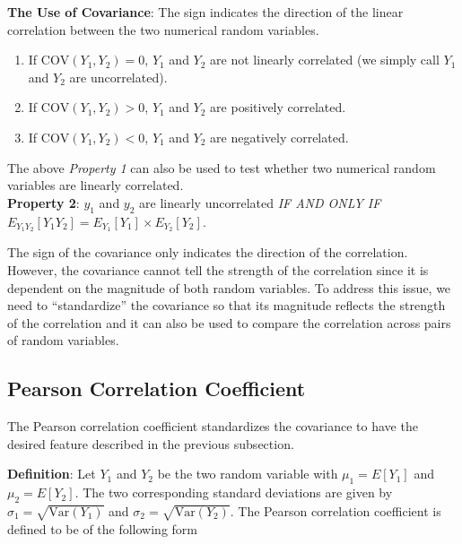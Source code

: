 \documentclass[
]{book}
\begin{document}
\textbf{The Use of Covariance}: The sign indicates the direction of the linear correlation between the two numerical random variables.

\begin{enumerate}
\def\labelenumi{\arabic{enumi}.}
\item
  If \(\text{COV}(Y_1, Y_2) = 0\), \(Y_1\) and \(Y_2\) are not linearly correlated (we simply call \(Y_1\) and \(Y_2\) are uncorrelated).
\item
  If \(\text{COV}(Y_1, Y_2) > 0\), \(Y_1\) and \(Y_2\) are positively correlated.
\item
  If \(\text{COV}(Y_1, Y_2) < 0\), \(Y_1\) and \(Y_2\) are negatively correlated.
\end{enumerate}

\hfill\break

The above \emph{Property 1} can also be used to test whether two numerical random variables are linearly correlated.\\

\textbf{Property 2}: \(y_1\) and \(y_2\) are linearly uncorrelated \emph{IF AND ONLY IF} \(E_{Y_1Y_2}[Y_1Y_2] = E_{Y_1}[Y_1]\times E_{Y_2}[Y_2]\).

The sign of the covariance only indicates the direction of the correlation. However, the covariance cannot tell the strength of the correlation since it is dependent on the magnitude of both random variables. To address this issue, we need to ``standardize'' the covariance so that its magnitude reflects the strength of the correlation and it can also be used to compare the correlation across pairs of random variables.

\hfill\break

\hypertarget{pearson-correlation-coefficient}{%
\subsection{Pearson Correlation Coefficient}\label{pearson-correlation-coefficient}}

The Pearson correlation coefficient standardizes the covariance to have the desired feature described in the previous subsection.

\textbf{Definition}: Let \(Y_1\) and \(Y_2\) be the two random variable with \(\mu_1 = E[Y_1]\) and \(\mu_2 = E[Y_2]\). The two corresponding standard deviations are given by \(\sigma_1 = \sqrt{\text{Var}(Y_1)}\) and \(\sigma_2 = \sqrt{\text{Var}(Y_2)}\). The Pearson correlation coefficient is defined to be of the following form
\end{document}
